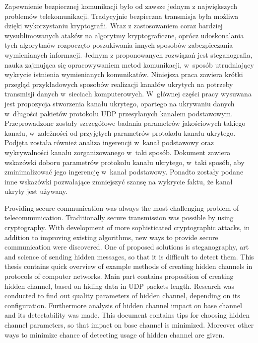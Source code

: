 \documentclass[a4paper, twoside, 12pt]{report}
\newenvironment{abstractpage}
  {\vspace*{\fill}\thispagestyle{empty}}
    {\vfill}
\renewenvironment{abstract}[1]
      {\bigskip\selectlanguage{#1}%
             \begin{center}\bfseries\abstractname\end{center}}
           {\par\bigskip}
\begin{document}



\begin{abstractpage}
\begin{abstract}{polish}
    Zapewnienie bezpiecznej komunikacji było od zawsze jednym z największych
    problemów telekomunikacji. Tradycyjnie bezpieczna transmisja była możliwa
    dzięki wykorzystaniu kryptografii. Wraz z zastosowaniem coraz bardziej wysublimowanych
    ataków na algorytmy kryptograficzne, oprócz udoskonalania tych algorytmów rozpoczęto
    poszukiwania innych sposobów zabezpieczania wymienianych informacji. Jednym
    z proponowanych rozwiązań jest steganografia, nauka zajmująca się opracowywaniem
    metod komunikacji, w~sposób utrudniający wykrycie istnienia wymienianych komunikatów.
    Niniejsza praca zawiera krótki przegląd przykładowych sposobów
    realizacji kanałów ukrytych na potrzeby transmisji danych w~sieciach komputerowych.
    W~głównej części pracy wysuwana jest propozycja stworzenia kanału ukrytego, opartego na ukrywaniu
    danych w~długości pakietów protokołu UDP przesyłanych kanałem podstawowym.
    Przeprowadzone
    zostały szczegółowe badania parametrów jakościowych takiego kanału, w~zależności
    od przyjętych parametrów protokołu kanału ukrytego. Podjęta została również
    analiza ingerencji w~kanał podstawowy oraz wykrywalności kanału zorganizowanego w~taki sposób.
    Dokument zawiera wskazówki doboru parametrów protokołu kanału ukrytego, w~taki sposób, aby
    zminimalizować jego ingerencję w~kanał podstawowy. Ponadto zostały podane inne
    wskazówki pozwalające zmniejszyć szansę na wykrycie faktu, że kanał ukryty jest
    używany.
\end{abstract}

\begin{abstract}{english}
    Providing secure communication was always the most challenging problem
    of telecommunication. Traditionally secure transmission was possible by
    using cryptography. With development of more sophisticated cryptographic attacks,
    in addition to improving existing algorithms, new ways to provide secure communication
    were discovered. One of proposed solutions is steganography, art and science
    of sending hidden messages, so that it is difficult to detect them. This thesis
    contains quick overview of example methods of creating hidden channels in
    protocols of computer networks. Main part contains proposition of creating
    hidden channel, based on hiding data in UDP packets length. Research was
    conducted to find out quality parameters of hidden channel, depending on
    its configuration. Furthermore analysis of hidden channel impact on base channel
    and its detectability was made. This document contains tips for choosing hidden
    channel parameters, so that impact on base channel is minimized. Moreover
    other ways to minimize chance of detecting usage of hidden channel are given.
\end{abstract}
\end{abstractpage}
\end{document}
